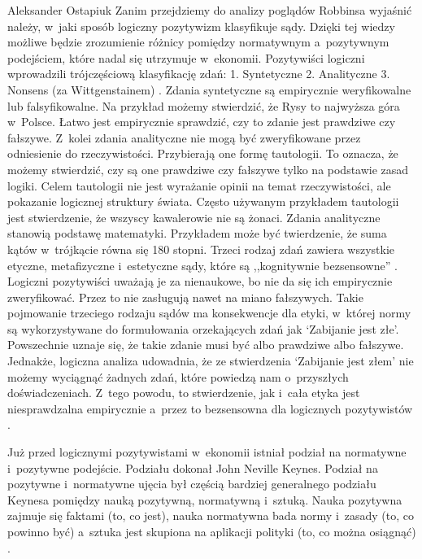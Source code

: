 \begin{artplenv}{Aleksander Ostapiuk}
Zanim przejdziemy do analizy poglądów Robbinsa wyjaśnić należy, w~jaki sposób logiczny pozytywizm klasyfikuje sądy.
Dzięki tej wiedzy możliwe będzie zrozumienie różnicy pomiędzy normatywnym a~pozytywnym podejściem, które nadal się
utrzymuje w~ekonomii. Pozytywiści logiczni wprowadzili trójczęściową klasyfikację zdań: 1. Syntetyczne 2. Analityczne
3. Nonsens (za Wittgenstainem)
\parencite[s.~10 i~18]{putnam_collapse_2002}.
Zdania syntetyczne są empirycznie
weryfikowalne lub falsyfikowalne. Na przykład możemy stwierdzić, że Rysy to najwyższa góra w~Polsce. Łatwo jest
empirycznie sprawdzić, czy to zdanie jest prawdziwe czy fałszywe. Z~kolei zdania analityczne nie mogą być zweryfikowane
przez odniesienie do rzeczywistości. Przybierają one formę tautologii. To oznacza, że możemy stwierdzić, czy są one
prawdziwe czy fałszywe tylko na podstawie zasad logiki. Celem tautologii nie jest wyrażanie opinii na temat
rzeczywistości, ale pokazanie logicznej struktury świata. Często używanym przykładem tautologii jest stwierdzenie, że
wszyscy kawalerowie nie są żonaci. Zdania analityczne stanowią podstawę matematyki. Przykładem może być twierdzenie, że
suma kątów w~trójkącie równa się 180 stopni. Trzeci rodzaj zdań zawiera wszystkie etyczne, metafizyczne i~estetyczne
sądy, które są ,,kognitywnie bezsensowne''
\parencite[s.~10]{putnam_collapse_2002}.
Logiczni pozytywiści uważają
je za nienaukowe, bo nie da się ich empirycznie zweryfikować. Przez to nie zasługują nawet na miano fałszywych. Takie
pojmowanie trzeciego rodzaju sądów ma konsekwencje dla etyki, w~której normy są wykorzystywane do formułowania
orzekających zdań jak `Zabijanie jest złe'. Powszechnie uznaje się, że takie zdanie musi być albo prawdziwe albo
fałszywe. Jednakże, logiczna analiza udowadnia, że ze stwierdzenia `Zabijanie jest złem' nie możemy wyciągnąć żadnych
zdań, które powiedzą nam o~przyszłych doświadczeniach. Z~tego powodu, to stwierdzenie, jak i~cała etyka jest
niesprawdzalna empirycznie a~przez to bezsensowna dla logicznych pozytywistów
\parencite[s.~25]{carnap_philosophy_1935}.

Już przed logicznymi pozytywistami w~ekonomii istniał podział na normatywne i~pozytywne podejście. Podziału dokonał John
Neville Keynes. Podział na pozytywne i~normatywne ujęcia był częścią bardziej generalnego podziału Keynesa pomiędzy
nauką pozytywną, normatywną i~sztuką. Nauka pozytywna zajmuje się faktami (to, co jest), nauka normatywna bada
normy i~zasady (to, co powinno być) a~sztuka jest skupiona na aplikacji polityki (to, co można osiągnąć)
\parencite[s.~34–35]{keynes_scope_1917}.


\end{artplenv}
